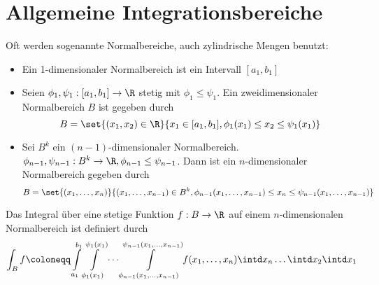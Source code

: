 \section{Allgemeine Integrationsbereiche}
Oft werden sogenannte Normalbereiche, auch zylindrische Mengen benutzt:
\begin{itemize}
	\item Ein 1-dimensionaler Normalbereich ist ein Intervall $[a_1,b_1]$
	\item Seien $\phi_1,\psi_1:[a_1,b_1]\rightarrow \R$ stetig mit $\phi_1\leq \psi_1$. Ein zweidimensionaler Normalbereich $B$ ist gegeben durch
	\begin{equation*}
		B=\set{(x_1,x_2)\in\R}{x_1\in[a_1,b_1],\phi_1(x_1)\leq x_2\leq \psi_1(x_1)}
	\end{equation*}

	\begin{center}
	\end{center}


	\item Sei $B^k$ ein $(n-1)$-dimensionaler Normalbereich. $\phi_{n-1},\psi_{n-1}:B^k\rightarrow \R, \phi_{n-1}\leq\psi_{n-1}$. Dann ist ein $n$-dimensionaler Normalbereich gegeben durch
	\begin{equation*}
		B=\set{(x_1,\ldots,x_n)}{(x_1,\ldots,x_{n-1})\in B^k, \phi_{n-1}(x_1,\ldots,x_{n-1})\leq x_n\leq\psi_{n-1}(x_1,\ldots,x_{n-1})}
	\end{equation*}
\end{itemize}
Das Integral über eine stetige Funktion $f:B\rightarrow \R$ auf einem $n$-dimensionalen Normalbereich ist definiert durch
\begin{equation*}
	\int_Bf\coloneqq
	\int\limits_{a_1}^{b_1}
	\int\limits_{\phi_1(x_1)}^{\psi_1(x_1)}
	\cdots
	\int\limits_{\phi_{n-1}(x_1,\ldots,x_{n-1})}^{\psi_{n-1}(x_1,\ldots,x_{n-1})}f(x_1,\ldots,x_n)
	\intd x_n\ldots\intd x_2\intd x_1
\end{equation*}

